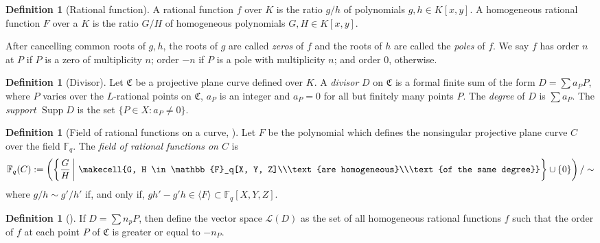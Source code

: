 \documentclass[11pt, oneside]{amsart}
\theoremstyle{definition}
\newtheorem{defn}[thm]{Definition}
\theoremstyle{remark}
\numberwithin{equation}{section}
\DeclareMathOperator{\Supp}{Supp}
\begin{document}
\begin{defn}[Rational function]
	A rational function $f$ over $K$ is the ratio $g/h$ of polynomials $g, h \in K[x, y]$.
	A homogeneous rational function $F$ over a $K$ is the ratio $G/H$ of homogeneous polynomials $G, H \in K[x, y]$.

	After cancelling common roots of $g, h$, the roots of $g$ are called \emph{zeros} of $f$ and the roots of $h$ are called the \emph{poles} of $f$.  
	We say $f$ has order $n$ at $P$ if $P$ is a zero of multiplicity $n$; order $-n$ if $P$ is a pole with multiplicity $n$; and order $0$, otherwise.
\end{defn}

\begin{defn}[Divisor] 
	Let $\mathfrak C$ be a projective plane curve defined over $K$.
	A \emph{divisor} $D$ on $\mathfrak C$ is a formal finite sum of the form $D = \sum a_P P$, where $P$ varies over the $L$-rational points on $\mathfrak C$, $a_P$ is an integer and $a_P = 0$ for all but finitely many points $P$.
	The \emph{degree} of $D$ is $\sum a_P$.
	The \emph{support} $\Supp D$ is the set $\{P \in X : a_P \neq 0\}$.
\end{defn}

\begin{defn}[Field of rational functions on a curve, \cite{Wal00}] %
	Let $F$ be the polynomial which defines the nonsingular projective plane curve $C$ over the field $\mathbb{F}_q$. The \emph{field of rational functions on $C$} is
	\begin{equation}
		\mathbb{F}_q(C) := \left(\left\{\frac{G}{H}\, \bigg|\,\, \makecell{G, H \in \mathbb{F}_q[X, Y, Z]\\\text{are homogeneous}\\\text{of the same degree}} \right\} \cup \{0\}\right) / \sim
	\end{equation}
	where $g/h \sim g'/h'$ if, and only if, $gh' - g'h \in \langle F \rangle \subset \mathbb{F}_q[X, Y, Z]$.
\end{defn}

\begin{defn}[\cite{LS87}]
	If $D = \sum n_p P$, then define the vector space $\mathcal L(D)$ as the set of all homogeneous rational functions $f$ such that the order of $f$ at each point $P$ of $\mathfrak C$ is greater or equal to $-n_P$.
\end{defn}
\end{document}
